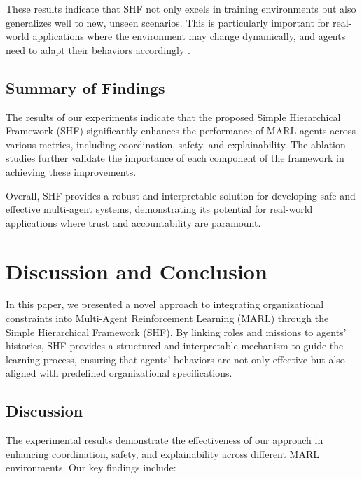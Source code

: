 \documentclass[sigconf,anonymous]{aamas}
\begin{document}

These results indicate that SHF not only excels in training environments but also generalizes well to new, unseen scenarios. This is particularly important for real-world applications where the environment may change dynamically, and agents need to adapt their behaviors accordingly \cite{wei2019safe}.

\subsection{Summary of Findings}
The results of our experiments indicate that the proposed Simple Hierarchical Framework (SHF) significantly enhances the performance of MARL agents across various metrics, including coordination, safety, and explainability. The ablation studies further validate the importance of each component of the framework in achieving these improvements.

Overall, SHF provides a robust and interpretable solution for developing safe and effective multi-agent systems, demonstrating its potential for real-world applications where trust and accountability are paramount.


\section{Discussion and Conclusion}
\label{sec:discussion_conclusion}

In this paper, we presented a novel approach to integrating organizational constraints into Multi-Agent Reinforcement Learning (MARL) through the Simple Hierarchical Framework (SHF). By linking roles and missions to agents' histories, SHF provides a structured and interpretable mechanism to guide the learning process, ensuring that agents' behaviors are not only effective but also aligned with predefined organizational specifications.


\subsection{Discussion}
The experimental results demonstrate the effectiveness of our approach in enhancing coordination, safety, and explainability across different MARL environments. Our key findings include:
\end{document}
